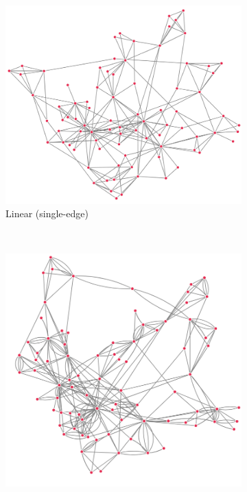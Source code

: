 \begin{figure}[H]
     \centering
      \begin{subfigure}[b]{.292\textheight}
         \centering
     \includegraphics[width=\textwidth]{figures_c1/edgetype/linearsingle.png} \caption{Linear (single-edge)}
     \end{subfigure}\\
    \begin{subfigure}[b]{.292\textheight}
         \centering
     \includegraphics[width=\textwidth]{figures_c1/edgetype/multiquadraticgray.png}

\end{subfigure}
\end{figure}
